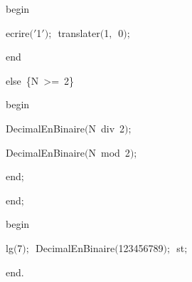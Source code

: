 {\vspace{\neglskip}\mbox{\blc  \blk\blk\blk\idt  \mcl begin\idt }\par 
\vspace{\neglskip}\mbox{\blc  \blk\blk\blk\blk\idt  ecrire$($\cha $\scriptstyle '$1\idt $\scriptstyle '$$)$$;$\ translater$($1$,$\ 0$)$$;$}\par 
\vspace{\neglskip}\mbox{\blc  \blk\blk\blk\idt  \mcl end\idt }\par 
\pagebreak[3] 
\vspace{\neglskip}\mbox{\blc  \blk\idt  \mcl else\idt \ \cmt  \{N\ >=\ 2\}\idt }\par 
\vspace{\neglskip}\mbox{\blc  \blk\blk\blk\idt  \mcl begin\idt }\par 
\vspace{\neglskip}\mbox{\blc  \blk\blk\blk\blk\idt  DecimalEnBinaire$($N\ \mcl div\idt \ 2$)$$;$}\par 
\vspace{\neglskip}\mbox{\blc  \blk\blk\blk\blk\idt  DecimalEnBinaire$($N\ \mcl mod\idt \ 2$)$$;$}\par 
\vspace{\neglskip}\mbox{\blc  \blk\blk\blk\idt  \mcl end\idt $;$}\par 
\vspace{\neglskip}\mbox{\blc  \blk\idt  \mcl end\idt $;$}\par 
\medskip

\vspace{\neglskip}\mbox{\blc  \idt  \mcl begin\idt }\par 
\vspace{\neglskip}\mbox{\blc  \blk\idt  lg$($7$)$$;$\ DecimalEnBinaire$($123456789$)$$;$\ st$;$}\par 
\vspace{\neglskip}\mbox{\blc  \idt  \mcl end\idt $.$}\par 
\medskip


\medskip }

